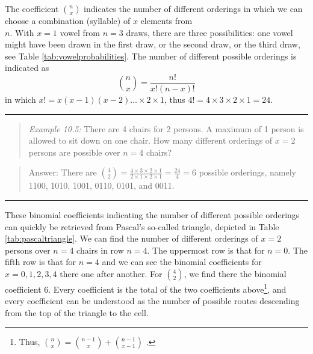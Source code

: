\documentclass[
]{book}
\begin{document}
The coefficient \({n \choose x}\) indicates the number of different orderings
in which we can choose a combination (syllable) of \(x\) elements from\\
\(n\). With \(x=1\) vowel from \(n=3\) draws, there are three possibilities:
one vowel might have been drawn in the first draw, or the second
draw, or the third draw, see
Table \ref{tab:vowelprobabilities}. The number of different possible
orderings is indicated as\\
\begin{equation}
  {n \choose x} = \frac{n!}{x!(n-x)!}
  \label{eq:choose}
\end{equation}
in which
\(x! = x (x-1) (x-2) \dots \times 2 \times 1\), thus
\(4!=4\times3\times2\times1=24\).

\begin{center}\rule{0.5\linewidth}{0.5pt}\end{center}

\begin{quote}
\emph{Example 10.5:} There are 4 chairs for 2 persons. A maximum of 1 person is
allowed to sit down on one chair. How many different orderings of \(x=2\) persons
are possible over \(n=4\) chairs?
\end{quote}

\begin{quote}
Answer: There are
\({4 \choose 2} = \frac{4\times3\times2\times1}{2\times1\times2\times1} = \frac{24}{4} = 6\)
possible orderings, namely 1100, 1010, 1001, 0110, 0101, and 0011.
\end{quote}

\begin{center}\rule{0.5\linewidth}{0.5pt}\end{center}

These binomial coefficients indicating the number of different
possible orderings can quickly be retrieved from Pascal's so-called
triangle, depicted in Table \ref{tab:pascaltriangle}.
We can find the number of different
orderings of \(x=2\) persons over \(n=4\) chairs in row \(n=4\).
The uppermost row is that for \(n=0\). The fifth row is that for \(n=4\) and we
can see the binomial coefficients for \(x= 0, 1, 2, 3, 4\) there one after another.
For \({4 \choose 2}\), we find there the binomial coefficient \(6\).
Every coefficient is the total of the two coefficients above\footnote{Thus, \({n \choose x} = {n-1 \choose x} + {n-1 \choose x-1}\) \citep{Weis15}.}, and
every coefficient can be understood as the number of possible
routes descending from the top of the triangle
to the cell.
\end{document}
